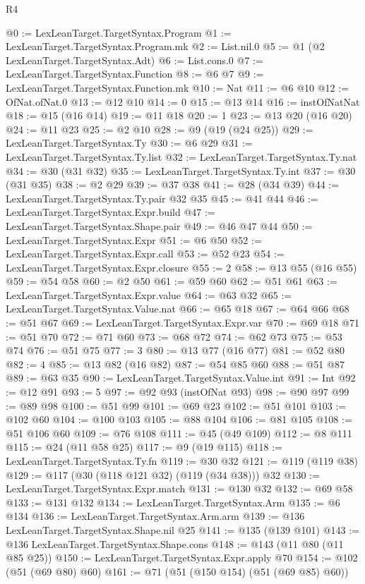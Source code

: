 \begin{lexlean}{R4}
\begin{coremodule}
@0 := LexLeanTarget.TargetSyntax.Program
@1 := LexLeanTarget.TargetSyntax.Program.mk
@2 := List.nil.{0}
@5 := @1 (@2 LexLeanTarget.TargetSyntax.Adt)
@6 := List.cons.{0}
@7 := LexLeanTarget.TargetSyntax.Function
@8 := @6 @7
@9 := LexLeanTarget.TargetSyntax.Function.mk
@10 := Nat
@11 := @6 @10
@12 := OfNat.ofNat.{0}
@13 := @12 @10
@14 := 0
@15 := @13 @14
@16 := instOfNatNat
@18 := @15 (@16 @14)
@19 := @11 @18
@20 := 1
@23 := @13 @20 (@16 @20)
@24 := @11 @23
@25 := @2 @10
@28 := @9 (@19 (@24 @25))
@29 := LexLeanTarget.TargetSyntax.Ty
@30 := @6 @29
@31 := LexLeanTarget.TargetSyntax.Ty.list
@32 := LexLeanTarget.TargetSyntax.Ty.nat
@34 := @30 (@31 @32)
@35 := LexLeanTarget.TargetSyntax.Ty.int
@37 := @30 (@31 @35)
@38 := @2 @29
@39 := @37 @38
@41 := @28 (@34 @39)
@44 := LexLeanTarget.TargetSyntax.Ty.pair @32 @35
@45 := @41 @44
@46 := LexLeanTarget.TargetSyntax.Expr.build
@47 := LexLeanTarget.TargetSyntax.Shape.pair
@49 := @46 @47 @44
@50 := LexLeanTarget.TargetSyntax.Expr
@51 := @6 @50
@52 := LexLeanTarget.TargetSyntax.Expr.call
@53 := @52 @23
@54 := LexLeanTarget.TargetSyntax.Expr.closure
@55 := 2
@58 := @13 @55 (@16 @55)
@59 := @54 @58
@60 := @2 @50
@61 := @59 @60
@62 := @51 @61
@63 := LexLeanTarget.TargetSyntax.Expr.value
@64 := @63 @32
@65 := LexLeanTarget.TargetSyntax.Value.nat
@66 := @65 @18
@67 := @64 @66
@68 := @51 @67
@69 := LexLeanTarget.TargetSyntax.Expr.var
@70 := @69 @18
@71 := @51 @70
@72 := @71 @60
@73 := @68 @72
@74 := @62 @73
@75 := @53 @74
@76 := @51 @75
@77 := 3
@80 := @13 @77 (@16 @77)
@81 := @52 @80
@82 := 4
@85 := @13 @82 (@16 @82)
@87 := @54 @85 @60
@88 := @51 @87
@89 := @63 @35
@90 := LexLeanTarget.TargetSyntax.Value.int
@91 := Int
@92 := @12 @91
@93 := 5
@97 := @92 @93 (instOfNat @93)
@98 := @90 @97
@99 := @89 @98
@100 := @51 @99
@101 := @69 @23
@102 := @51 @101
@103 := @102 @60
@104 := @100 @103
@105 := @88 @104
@106 := @81 @105
@108 := @51 @106 @60
@109 := @76 @108
@111 := @45 (@49 @109)
@112 := @8 @111
@115 := @24 (@11 @58 @25)
@117 := @9 (@19 @115)
@118 := LexLeanTarget.TargetSyntax.Ty.fn
@119 := @30 @32
@121 := @119 (@119 @38)
@129 := @117 (@30 (@118 @121 @32) (@119 (@34 @38))) @32
@130 := LexLeanTarget.TargetSyntax.Expr.match
@131 := @130 @32
@132 := @69 @58
@133 := @131 @132
@134 := LexLeanTarget.TargetSyntax.Arm
@135 := @6 @134
@136 := LexLeanTarget.TargetSyntax.Arm.arm
@139 := @136 LexLeanTarget.TargetSyntax.Shape.nil @25
@141 := @135 (@139 @101)
@143 := @136 LexLeanTarget.TargetSyntax.Shape.cons
@148 := @143 (@11 @80 (@11 @85 @25))
@150 := LexLeanTarget.TargetSyntax.Expr.apply @70
@154 := @102 (@51 (@69 @80) @60)
@161 := @71 (@51 (@150 @154) (@51 (@69 @85) @60))

\end{coremodule}
\end{lexlean}
